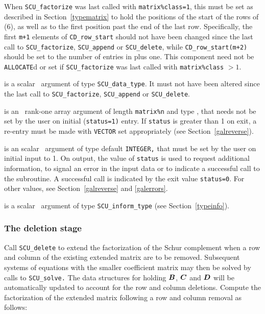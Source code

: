 \documentclass{galahad}
\newcommand{\packagename}{SCU}
\begin{document}
\begin{description}
\begin{description}
When {\tt \packagename\_factorize} was last called with {\tt matrix\%class=1}, 
this must be set as described in Section~\ref{typematrix} to hold the 
positions of the start of the rows of (6), as well as to the first 
position past the end of the last row. 
Specifically, the first {\tt m+1} elements 
of {\tt CD\_row\_start} should not have been changed since the last call to 
{\tt \packagename\_factorize}, {\tt \packagename\_append} or 
{\tt \packagename\_delete}, while 
{\tt CD\_row\_start(m+2)} should be set to the number of entries in 
 plus one. 
This component need not be {\tt ALLOCATE}d or set if 
{\tt \packagename\_factorize} was last called with {\tt matrix\%class} $> 1$. 
 
\end{description} 
 
 is a scalar \intentinout\ argument of type 
{\tt \packagename\_data\_type}. 
It must not have been altered since the last call to  
{\tt \packagename\_factorize}, 
{\tt \packagename\_append} or 
{\tt \packagename\_delete}. 
 
 is an \intentinout\ rank-one array argument of length 
{\tt matrix\%n} 
and type \realdp, that needs not be set by 
the user on initial ({\tt status=1)} entry. If {\tt status} is greater than 
1 on exit, a re-entry must be made with {\tt VECTOR} set appropriately 
(see Section~\ref{galreverse}). 
 
 is an scalar \intentinout\ argument of type default 
{\tt INTEGER,} that  
must be set by the user on initial input to 1. On output, the value of 
{\tt status} 
is used to request additional information, to signal an error 
in the input data or to indicate a successful call to the subroutine. 
A successful call is indicated by the exit value {\tt status=0}. 
For other values, see Section~\ref{galreverse} and \ref{galerrors}. 
 
 is a scalar \intentinout\ argument of type 
{\tt \packagename\_inform\_type} (see Section~\ref{typeinfo}). 
 
\end{description}


\subsubsection{The deletion stage}
Call {\tt \packagename\_delete} to extend the factorization of the Schur 
complement when a row and column of the existing 
extended matrix are to be removed. 
Subsequent systems of equations with the smaller 
coefficient matrix may then be solved by calls to {\tt \packagename\_solve.} 
The data structures for holding ${\bm{B}}$, ${\bm{C}}$ and ${\bm{D}}$ will be 
automatically updated to account for the row and column deletions. 
Compute the factorization of the extended matrix 
following a row and column removal as follows:
\vspace*{1mm}
\end{document}
